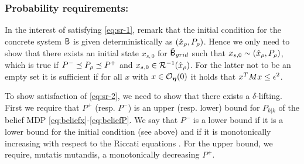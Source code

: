 \documentclass{ifacconf}
\newcommand{\red}[1]{{\color{red} #1}}
\begin{document}
\subsubsection{Probability requirements:}

In the interest of satisfying \eqref{eq:sr-1}, remark that the initial condition for the concrete system $\mathsf{B}$ is given deterministically as $(\hat x_\rho, P_\rho)$. Hence we only need to show that there exists an initial state $x_{s,0}$ for $\tilde {\mathsf{B}}_{grid}$ such that \red{$x_{s,0} \sim (\hat x_\rho, P_\rho)$}, which is true if  $P^-\preceq  P_\rho \preceq P^+$ and $x_{s,0}\in \mathcal{R}^{-1}( \hat x_\rho )$. For the latter not to be an empty set it is sufficient if for all $x$ with $x \in \mathcal{O}_{\boldsymbol{\eta}}(0)$ it holds that $x^T M x \leq \epsilon^2$.

To show satisfaction of \eqref{eq:sr-2}, we need to show that there exists a $\delta$-lifting. First we require that $P^+$ (resp. $P^-$) is an upper (resp. lower) bound for $P_{k|k}$ of the belief MDP \eqref{eq:beliefx}-\eqref{eq:beliefP}.  We say that $P^-$ is a lower bound if it is a lower bound for the initial condition (see above) and   if it is monotonically increasing with respect to the Riccati equations \citep{bitmead1985monotonicity}. For the upper bound, we require, mutatis mutandis, a monotonically decreasing $P^+$.
\end{document}
